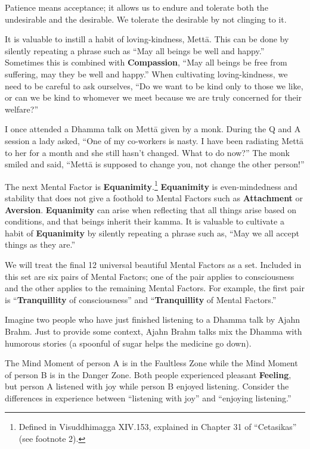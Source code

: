 Patience means acceptance; it allows us to endure and tolerate both the undesirable and the desirable. We tolerate the desirable by not clinging to it.

It is valuable to instill a habit of loving-kindness, Mettā. This can be done by silently repeating a phrase such as “May all beings be well and happy.” Sometimes this is combined with \textbf{Compassion}, “May all beings be free from suffering, may they be well and happy.” When cultivating loving-kindness, we need to be careful to ask ourselves, “Do we want to be kind only to those we like, or can we be kind to whomever we meet because we are truly concerned for their welfare?”

I once attended a Dhamma talk on Mettā given by a monk. During the Q and A session a lady asked, “One of my co-workers is nasty. I have been radiating Mettā to her for a month and she still hasn’t changed. What to do now?” The monk smiled and said, “Mettā is supposed to change you, not change the other person!”

The next Mental Factor is \textbf{Equanimity}.\footnote{Defined in Visuddhimagga XIV.153, explained in Chapter 31 of “Cetasikas” (see footnote 2).} \textbf{Equanimity} is even-mindedness and stability that does not give a foothold to Mental Factors such as \textbf{Attachment} or \textbf{Aversion}. \textbf{Equanimity} can arise when reflecting that all things arise based on conditions, and that beings inherit their kamma. It is valuable to cultivate a habit of \textbf{Equanimity} by silently repeating a phrase such as, “May we all accept things as they are.”

We will treat the final 12 universal beautiful Mental Factors as a set. Included in this set are six pairs of Mental Factors; one of the pair applies to consciousness and the other applies to the remaining Mental Factors. For example, the first pair is “\textbf{Tranquillity} of consciousness” and “\textbf{Tranquillity} of Mental Factors.”

Imagine two people who have just finished listening to a Dhamma talk by Ajahn Brahm. Just to provide some context, Ajahn Brahm talks mix the Dhamma with humorous stories (a spoonful of sugar helps the medicine go down).

The Mind Moment of person A is in the Faultless Zone while the Mind Moment of person B is in the Danger Zone. Both people experienced pleasant \textbf{Feeling}, but person A listened with joy while person B enjoyed listening. Consider the differences in experience between “listening with joy” and “enjoying listening.”

